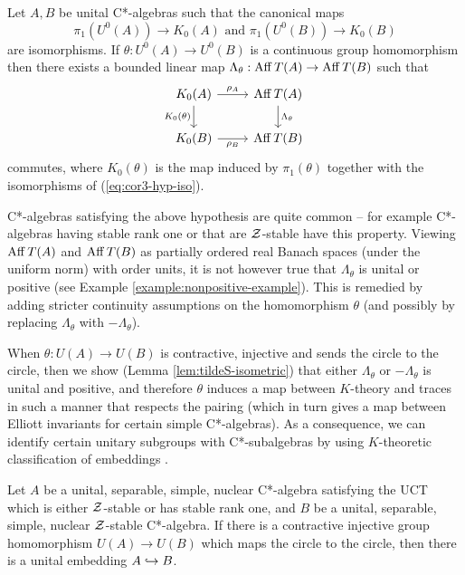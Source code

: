 \documentclass[12pt]{amsart}
\begin{document}
\begin{resultcor}
Let $A,B$ be unital C*-algebras such that the canonical maps
\begin{equation}\label{eq:cor3-hyp-iso}
\pi_1(U^0(A)) \to K_0(A) \text{ and }\pi_1(U^0(B)) \to K_0(B)
\end{equation}
are isomorphisms. If $\theta: U^0(A) \to U^0(B)$ is a continuous group homomorphism then there exists a bounded linear map $\Lambda_\theta: \operatorname{Aff} T(A) \to \operatorname{Aff} T(B)$ such that
\begin{equation}
\begin{tikzcd}
K_0(A) \arrow[r, "\rho_A"] \arrow[d, "K_0(\theta)"'] & \Aff T(A) \arrow[d, "\Lambda_\theta"] \\
K_0(B) \arrow[r, "\rho_B"']                            & \Aff T(B)                     
\end{tikzcd}
\end{equation}
commutes, where $K_0(\theta)$ is the map induced by $\pi_1(\theta)$ together with the isomorphisms of (\ref{eq:cor3-hyp-iso}).
\end{resultcor}

C*-algebras satisfying the above hypothesis are quite common -- for example C*-algebras having stable rank one \cite{Rieffel87} or that are $\mathcal{Z}$-stable \cite{Jiang97} have this property. Viewing $\operatorname{Aff} T(A)$ and $\operatorname{Aff} T(B)$ as partially ordered real Banach spaces (under the uniform norm) with order units, it is not however true that $\Lambda_\theta$ is unital or positive (see Example \ref{example:nonpositive-example}). This is remedied by adding stricter continuity assumptions on the homomorphism $\theta$ (and possibly by replacing $\Lambda_\theta$ with $-\Lambda_\theta$).

When $\theta: U(A) \to U(B)$ is contractive, injective and sends the circle to the circle, then we show (Lemma \ref{lem:tildeS-isometric}) that either $\Lambda_\theta$ or $-\Lambda_\theta$ is unital and positive, and therefore $\theta$ induces a map between $K$-theory and traces in such a manner that respects the pairing (which in turn gives a map between Elliott invariants for certain simple C*-algebras). As a consequence, we can identify certain unitary subgroups with C*-subalgebras by using $K$-theoretic classification of embeddings \cite{CGSTW23}. 

\begin{result}
Let $A$ be a unital, separable, simple, nuclear C*-algebra satisfying the UCT which is either $\mathcal{Z}$-stable or has stable rank one, and $B$ be a unital, separable, simple, nuclear $\mathcal{Z}$-stable C*-algebra. If there is a contractive injective group homomorphism $U(A) \to U(B)$ which maps the circle to the circle, then there is a unital embedding $A \hookrightarrow B$.
\end{result}
\end{document}
